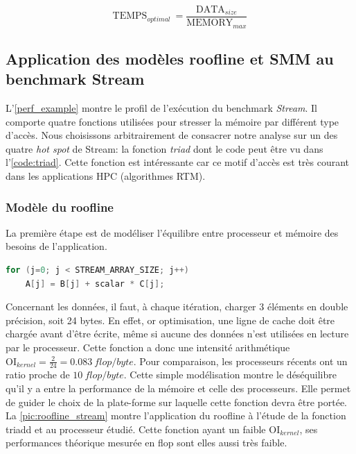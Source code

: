 \begin{equation}
    \text{TEMPS}_{optimal}\ = \frac{\text{DATA}_{size}}{\text{MEMORY}_{max}}
\end{equation}





\subsection{Application des modèles roofline et SMM au benchmark Stream}

L'\autoref{perf_example} montre le profil de l'exécution du benchmark \textit{Stream}. Il comporte quatre fonctions utilisées pour stresser la mémoire par différent type d'accès. Nous choisissons arbitrairement de consacrer notre analyse sur un des quatre \textit{hot spot} de Stream: la fonction \textit{triad} dont le code peut être vu dans l'\autoref{code:triad}. Cette fonction est intéressante car ce motif d'accès est très courant dans les applications HPC (algorithmes RTM).

\subsubsection{Modèle du roofline}
La première étape est de modéliser l'équilibre entre processeur et mémoire des besoins de l'application. 

\begin{lstlisting}[language=c,caption= La fonction triad du benchmark Stream utilise trois matrices: deux en lecture et une en écriture,label={code:triad}, 
  basicstyle=\footnotesize, frame=tb,
  xleftmargin=.065\textwidth, xrightmargin=.065\textwidth]
for (j=0; j < STREAM_ARRAY_SIZE; j++)
    A[j] = B[j] + scalar * C[j];
\end{lstlisting}


Concernant les données, il faut, à chaque itération, charger 3 éléments en double précision, soit 24 bytes. En effet, or optimisation, une ligne de cache doit être chargée avant d'être écrite, même si aucune des données n'est utilisées en lecture par le processeur. Cette fonction a donc une intensité arithmétique $\text{OI}_{kernel} = \frac{2}{24} = 0.083\ flop/byte$.
Pour comparaison, les processeurs récents ont un ratio proche de $10\ flop/byte$. Cette simple modélisation montre le déséquilibre qu'il y a entre la performance de la mémoire et celle des processeurs. Elle permet de guider le choix de la plate-forme sur laquelle cette fonction devra être portée. La \autoref{pic:roofline_stream} montre l'application du roofline à l'étude de la fonction triadd et au processeur étudié. Cette fonction ayant un faible $\text{OI}_{kernel}$, ses performances théorique mesurée en flop sont elles aussi très faible.


